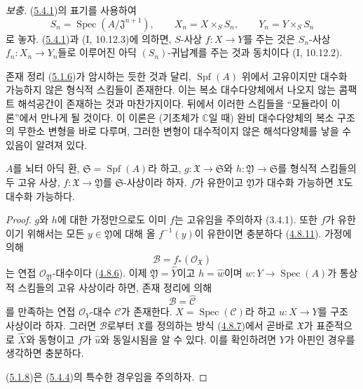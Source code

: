 \begin{env}[5.4.2]
\label{III.5.4.2-fr}
\emph{보충.}
(\hyperref[III.5.4.1-fr]{5.4.1})의 표기를 사용하여
\[
S_n=\operatorname{Spec}(A/\mathfrak J^{n+1}),\qquad
X_n=X\times_S S_n,\qquad Y_n=Y\times_S S_n
\]
로 놓자. (\hyperref[III.5.4.1-fr]{5.4.1})과 (I, 10.12.3)에
의하면, $S$-사상 $f:X\to Y$를 주는 것은 $S_n$-사상
$f_n:X_n\to Y_n$들로 이루어진 아딕 $(S_n)$-귀납계를 주는 것과
동치이다 (I, 10.12.2).
\end{env}

\begin{remark}[5.4.3]
\label{III.5.4.3-fr}
존재 정리 (\hyperref[III.5.1.6-fr]{5.1.6})가 암시하는 듯한 것과
달리, $\operatorname{Spf}(A)$ 위에서 고유이지만 대수화 가능하지
않은 형식적 스킴들이 존재한다. 이는 복소 대수다양체에서 나오지
않는 콤팩트 해석공간이 존재하는 것과 마찬가지이다. 뒤에서 이러한
스킴들을 ``모듈라이 이론''에서 만나게 될 것이다. 이 이론은
(기초체가 $\mathbb C$일 때) 완비 대수다양체의 복소 구조의 무한소
변형을 바로 다루며, 그러한 변형이 대수적이지 않은 해석다양체를
낳을 수 있음이 알려져 있다.
\end{remark}

\begin{proposition}[5.4.4]
\label{III.5.4.4-fr}
$A$를 뇌터 아딕 환, $\mathfrak S=\operatorname{Spf}(A)$라 하고,
$g:\mathfrak X\to\mathfrak S$와
$h:\mathfrak Y\to\mathfrak S$를 형식적 스킴들의 두 고유 사상,
$f:\mathfrak X\to\mathfrak Y$를 $\mathfrak S$-사상이라 하자.
$f$가 유한이고 $\mathfrak Y$가 대수화 가능하면
$\mathfrak X$도 대수화 가능하다.
\end{proposition}

\begin{proof}
$g$와 $h$에 대한 가정만으로도 이미 $f$는 고유임을 주의하자
(3.4.1). 또한 $f$가 유한이기 위해서는 모든
$y\in\mathfrak Y$에 대해 올 $f^{-1}(y)$이 유한이면 충분하다
(\hyperref[III.4.8.11-fr]{4.8.11}). 가정에 의해
\[
\mathcal B=f_*(\mathcal O_{\mathfrak X})
\]
는 연접 $\mathcal O_{\mathfrak Y}$-대수이다
(\hyperref[III.4.8.6-fr]{4.8.6}). 이제
$\mathfrak Y=\widehat Y$이고 $h=\widehat w$이며
$w:Y\to\operatorname{Spec}(A)$가 통상적 스킴들의 고유 사상이라
하면, 존재 정리에 의해
\[
\mathcal B=\widehat{\mathcal C}
\]
를 만족하는 연접 $\mathcal O_Y$-대수 $\mathcal C$가 존재한다.
$X=\operatorname{Spec}(\mathcal C)$라 하고 $u:X\to Y$를 구조
사상이라 하자. 그러면 $\mathcal B$로부터 $\mathfrak X$를
정의하는 방식 (\hyperref[III.4.8.7-fr]{4.8.7})에서 곧바로
$\mathfrak X$가 표준적으로 $\widehat X$와 동형이고 $f$가
$\widehat u$와 동일시됨을 알 수 있다. 이를 확인하려면 $Y$가
아핀인 경우를 생각하면 충분하다.

(\hyperref[III.5.1.8-fr]{5.1.8})은
(\hyperref[III.5.4.4-fr]{5.4.4})의 특수한 경우임을 주의하자.
\end{proof}

